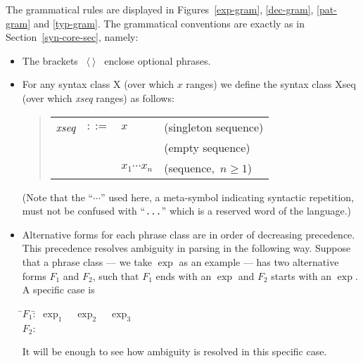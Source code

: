 The grammatical rules are displayed in Figures~\ref{exp-gram},
\ref{dec-gram}, \ref{pat-gram} and \ref{typ-gram}.
The grammatical conventions are exactly as in
Section~\ref{syn-core-sec}, namely:
\begin{itemize}
  \item The brackets ~$\langle\ \rangle$~ enclose optional phrases.
  \item For any syntax class X (over which $x$ ranges)
we define the syntax class Xseq (over which {\it xseq} ranges) as follows:
    \begin{quote}
    \begin{tabular}{rcll}
       {\it xseq} & $::=$ & $x$ & (singleton sequence)\\
                  &       &     & (empty sequence)\\
                  &       & \ml{(}$x_1$\ml{,}$\cdots$\ml{,}$x_n$\ml{)}
                                & (sequence,~$n\geq 1$) \\
    \end{tabular}
    \end{quote}
(Note that the ``$\cdots$'' used here, a meta-symbol indicating syntactic
repetition, must not be
confused with ``$\mbox{{\tt ...}}$'' which is a reserved word of the language.)
  \item Alternative forms for each phrase class are in order of decreasing
        precedence. This precedence resolves ambiguity in parsing in
the following way. Suppose that a phrase class --- we take $\exp$ as
an example --- has two alternative forms $F_1$ and $F_2$, such that $F_1$ ends
with an $\exp$ and $F_2$ starts with an $\exp$. A specific case is
\begin{tabbing}
\qquad\=$F_1$:\quad\=\IF\ $\exp_1$\ \THEN\ $\exp_2$\ \ELSE\ $\exp_3$\+\\
        $F_2$:     \>\handlexp
\end{tabbing}
It will be enough to see how ambiguity is resolved in this specific case.


\end{itemize}
